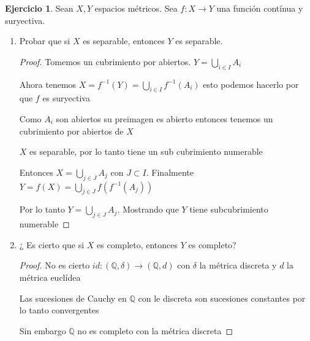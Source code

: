 \documentclass[11pt]{report}
\newcommand{\Q}{\mathbb{Q}}
\newcommand{\ra}{\rightarrow}
\theoremstyle{definition}
\newtheorem{ej}{Ejercicio}
\begin{document}
	\begin{ej}
		Sean $X,Y$ espacios métricos. Sea $f: X \ra Y$ una función contínua y suryectiva.
		\begin{enumerate}
			\item Probar que si $X$ es separable, entonces $Y$ es separable.
				\begin{proof}
					Tomemos un cubrimiento por abiertos. $Y = \bigcup_{i \in I} A_i$

					Ahora tenemos $X = f^{-1}(Y) = \bigcup_{i \in I} f^{-1} (A_i)$ esto podemos hacerlo por que $f$ es suryectiva

					Como $A_i$ son abiertos su preimagen es abierto entonces tenemos un cubrimiento por abiertos de $X$

					$X$ es separable, por lo tanto tiene un sub cubrimiento numerable

					Entonces $X = \bigcup_{j \in J} A_j $ con $J \subset I$. Finalmente $Y = f(X) = \bigcup_{j \in J} f(f^{-1}(A_j))$

					Por lo tanto $Y = \bigcup_{j \in J} A_j$. Mostrando que $Y$ tiene subcubrimiento numerable

					
				\end{proof}
			\item ¿ Es cierto que si $X$ es completo, entonces $Y$ es completo?
				\begin{proof}
					No es cierto $id:(\Q,\delta) \ra (\Q,d)$ con $\delta$ la métrica discreta y $d$ la métrica euclídea

					Las sucesiones de Cauchy en $\Q$ con le discreta son sucesiones constantes por lo tanto convergentes

					Sin embargo $\Q$ no es completo con la métrica discreta
				\end{proof}
		\end{enumerate}
	\end{ej}
	
\end{document}

